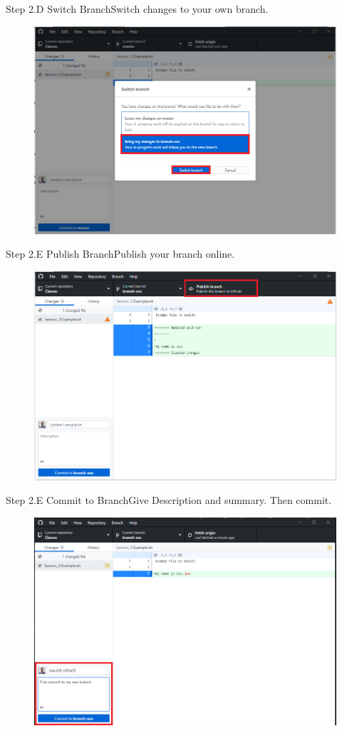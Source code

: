 \documentclass[aspectratio=169]{beamer}
\begin{document}
\begin{frame}{Step 2.D Switch Branch}{Switch changes to your own branch.}
	\begin{figure}
		\centering
		\includegraphics[width=0.7\linewidth]{../images/step2.D}
	\end{figure}
\end{frame}

\begin{frame}{Step 2.E Publish Branch}{Publish your branch online.}
	\begin{figure}
		\centering
		\includegraphics[width=0.7\linewidth]{../images/step2.E}
	\end{figure}
\end{frame}

\begin{frame}{Step 2.E Commit to Branch}{Give Description and summary. Then commit.}
	\begin{figure}
		\centering
		\includegraphics[width=0.7\linewidth]{../images/step2.F}
	\end{figure}
\end{frame}
\end{document}
